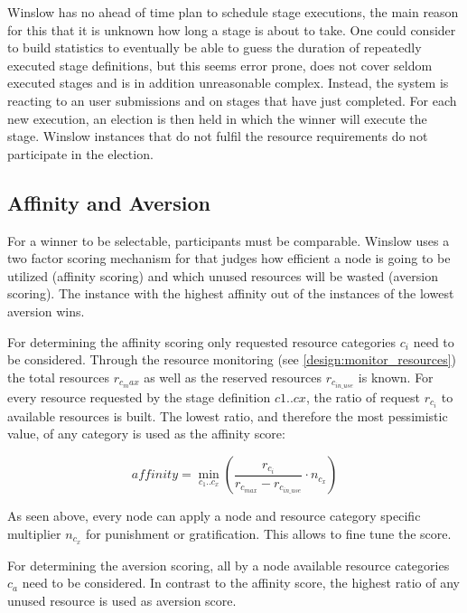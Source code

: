 Winslow has no ahead of time plan to schedule stage executions, the main reason for this that it is unknown how long a stage is about to take.
One could consider to build statistics to eventually be able to guess the duration of repeatedly executed stage definitions, but this seems error prone, does not cover seldom executed stages and is in addition unreasonable complex. 
Instead, the system is reacting to an user submissions and on stages that have just completed.
For each new execution, an election is then held in which the winner will execute the stage.
Winslow instances that do not fulfil the resource requirements do not participate in the election.

\subsection{Affinity and Aversion}
\label{election:affinity_and_aversion} 

For a winner to be selectable, participants must be comparable.
Winslow uses a two factor scoring mechanism for that judges how efficient a node is going to be utilized (affinity scoring) and which unused resources will be wasted (aversion scoring).
The instance with the highest affinity out of the instances of the lowest aversion wins.

For determining the affinity scoring only requested resource categories $c_i$ need to be considered.
Through the resource monitoring (see \autoref{design:monitor_resources}) the total resources $r_{c_max}$ as well as the reserved resources $r_{c_{in\_use}}$ is known.
For every resource requested by the stage definition $c1 .. cx$, the ratio of request $r_{c_i}$ to available resources is built.
The lowest ratio, and therefore the most pessimistic value, of any category is used as the affinity score:

\begin{equation}
	\label{election:eq:affinity}
	{affinity} = \min_{c_1 .. c_x} \left( \frac{r_{c_i}}{r_{c_{max}} - r_{c_{in\_use}}} \cdot n_{c_x} \right)
\end{equation}

As seen above, every node can apply a node and resource category specific multiplier $n_{c_x}$ for punishment or gratification.
This allows to fine tune the score.

For determining the aversion scoring, all by a node available resource categories $c_a$ need to be considered.
In contrast to the affinity score, the highest ratio of any unused resource is used as aversion score.

